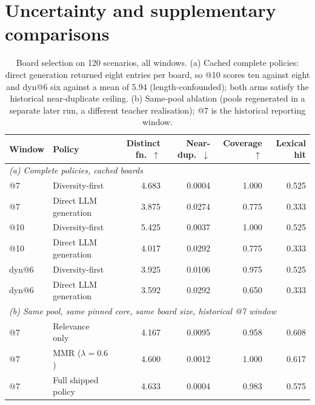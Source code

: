 \section{Uncertainty and supplementary comparisons}\label{app:uncertainty}
\begin{table}[h]
\centering\footnotesize\renewcommand{\arraystretch}{0.9}
\setlength{\tabcolsep}{5pt}\setlength{\belowcaptionskip}{3pt}
\caption{Board selection on 120 scenarios, all windows. (a) Cached complete policies: direct generation returned eight entries per board, so @10 scores ten against eight and dyn@6 six against a mean of 5.94 (length-confounded); both arms satisfy the historical near-duplicate ceiling. (b) Same-pool ablation (pools regenerated in a separate later run, a different teacher realisation); @7 is the historical reporting window.}
\label{tab:selectionfull}
\begin{tabular}{llrrrr}
\toprule
Window & Policy & Distinct fn.\ $\uparrow$ & Near-dup.\ $\downarrow$ & Coverage $\uparrow$ & Lexical hit\\
\midrule
\multicolumn{6}{l}{\emph{(a) Complete policies, cached boards}}\\
@7 & Diversity-first & 4.683 & 0.0004 & 1.000 & 0.525\\
@7 & Direct LLM generation & 3.875 & 0.0274 & 0.775 & 0.333\\
@10 & Diversity-first & 5.425 & 0.0037 & 1.000 & 0.525\\
@10 & Direct LLM generation & 4.017 & 0.0292 & 0.775 & 0.333\\
dyn@6 & Diversity-first & 3.925 & 0.0106 & 0.975 & 0.525\\
dyn@6 & Direct LLM generation & 3.592 & 0.0292 & 0.650 & 0.333\\
\midrule
\multicolumn{6}{l}{\emph{(b) Same pool, same pinned core, same board size, historical @7 window}}\\
@7 & Relevance only & 4.167 & 0.0095 & 0.958 & 0.608\\
@7 & MMR ($\lambda=0.6$) & 4.600 & 0.0012 & 1.000 & 0.617\\
@7 & Full shipped policy & 4.633 & 0.0004 & 0.983 & 0.575\\
\bottomrule
\end{tabular}
\end{table}

